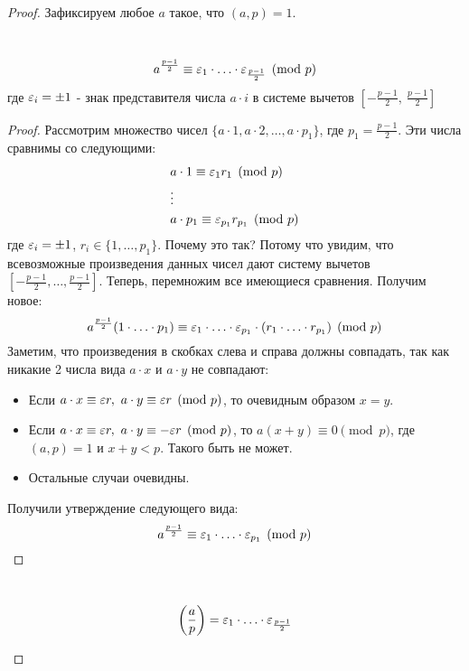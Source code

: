 \begin{proof}
	Зафиксируем любое $a$ такое, что $(a, p) = 1$.
	\begin{proposition}~
		\[
			a^{\frac{p - 1}{2}} \equiv \varepsilon_1 \cdot \ldots \cdot \varepsilon_{\frac{p - 1}{2}} \pmod p
		\]
		где $\varepsilon_i = \pm 1$ - знак представителя числа $a \cdot i$ в системе вычетов $\left[-\frac{p - 1}{2},\ \frac{p - 1}{2}\right]$
	\end{proposition}

	\begin{proof}
		Рассмотрим множество чисел $\{a \cdot 1, a \cdot 2, \ldots, a \cdot p_1\}$, где $p_1 = \frac{p - 1}{2}$. Эти числа сравнимы со следующими:
		\begin{align*}
			&{a \cdot 1 \equiv \varepsilon_1 r_1 \pmod p}
			\\
			&\vdots
			\\
			&{a \cdot p_1 \equiv \varepsilon_{p_1} r_{p_1} \pmod p}
		\end{align*}
		где $\varepsilon_i = \pm 1$, $r_i \in \{1, \ldots, p_1\}$. Почему это так? Потому что увидим, что всевозможные произведения данных чисел дают систему вычетов $\left[-\frac{p - 1}{2}, \ldots, \frac{p - 1}{2}\right]$. Теперь, перемножим все имеющиеся сравнения. Получим новое:
		\[
			a^{\frac{p - 1}{2}} (1 \cdot \ldots \cdot p_1) \equiv \varepsilon_1 \cdot \ldots \cdot \varepsilon_{p_1} \cdot (r_1 \cdot \ldots \cdot r_{p_1}) \pmod p
		\]
		Заметим, что произведения в скобках слева и справа должны совпадать, так как никакие 2 числа вида $a \cdot x$ и $a \cdot y$ не совпадают:
		\begin{itemize}
			\item Если $a \cdot x \equiv \varepsilon r,\ a \cdot y \equiv \varepsilon r \pmod p$, то очевидным образом $x = y$.
			
			\item Если $a \cdot x \equiv \varepsilon r,\ a \cdot y \equiv -\varepsilon r \pmod p$, то $a(x + y) \equiv 0 \pmod p$, где $(a, p) = 1$ и $x + y < p$. Такого быть не может.
			
			\item Остальные случаи очевидны.
		\end{itemize}
	
		Получили утверждение следующего вида:
		\[
			a^{\frac{p - 1}{2}} \equiv \varepsilon_1 \cdot \ldots \cdot \varepsilon_{p_1} \pmod p
		\]
	\end{proof}

	\begin{corollary}~
		\[
			\left(\frac{ a }{ p }\right) = \varepsilon_1 \cdot \ldots \cdot \varepsilon_{\frac{p - 1}{2}}
		\]
	\end{corollary}
	

\end{proof}
